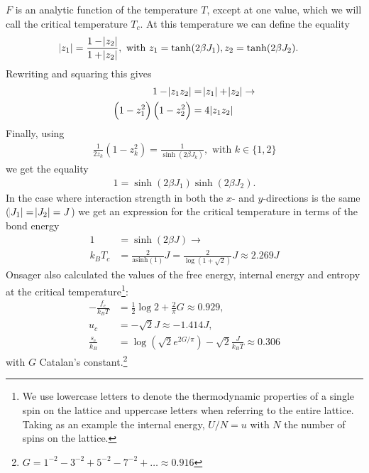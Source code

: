 \documentclass[11pt, a4paper]{report} %
\begin{document}
\(F\) is an analytic function of the temperature \(T\), except at one value, which we will call the critical temperature \(T_c\). At this temperature we can define the equality\cite{mccoy:1973}
\begin{align}
	\abs{z_1} &= \frac{1 - \abs{z_2}}{1+ \abs{z_2}}, \text{ with } z_1 = \tanh(2\beta J_1), z_2 = \tanh(2\beta J_2).
\end{align}
Rewriting and squaring this gives
\begin{align}
	\label{eq:ising_z_functions}
	1 - \abs{z_1 z_2} &= \abs{z_1} + \abs{z_2}\rightarrow\\
	\left(1 - z_1^2 \right) \left(1 - z_2^2 \right) &= 4 \abs{z_1 z_2}
\end{align}
Finally, using
\begin{align}
	\frac{1}{2 z_k}\left(1 - z_k^2\right) = \frac{1}{\sinh(2 \beta J_k)}, \text{ with } k \in \{{1, 2}\}
\end{align}
we get the equality
\begin{align}
	1 = \sinh(2\beta J_1) \sinh(2\beta J_2).
\end{align}
In the case where interaction strength in both the \(x\)- and \(y\)-directions is the same (\(\abs{J_1} = \abs{J_2} = J\)) we get an expression for the critical temperature in terms of the bond energy
\begin{align}
	1 &= \sinh(2\beta J) \to \\
	k_B T_c &= \frac{2}{\text{asinh}(1)}J = \frac{2}{\log(1+\sqrt{2})}J \approx 2.269 J
\end{align}
Onsager \cite{onsager:1944} also calculated the values of the free energy, internal energy and entropy at the critical temperature\footnote{We use lowercase letters to denote the thermodynamic properties of a single spin on the lattice and uppercase letters when referring to the entire lattice. Taking as an example the internal energy, \(U/N = u\) with \(N\) the number of spins on the lattice.}:
\begin{align}
	-\frac{f_c}{k_B T} &= \frac{1}{2} \log{2} + \frac{2}{\pi} G \approx 0.929, \\
	u_c &= - \sqrt{2} J \approx - 1.414 J,\\
	\frac{s_c}{k_B} &= \log{(\sqrt{2} e^{2G/\pi})} - \sqrt{2} \frac{J}{k_B T} \approx 0.306
\end{align}
with \(G\) Catalan's constant.\footnote{\(G = 1^{-2} - 3^{-2} + 5^{-2} - 7^{-2} +\ldots \approx 0.916\)}
\end{document}

